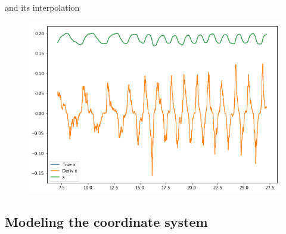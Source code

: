 \documentclass{beamer}
\begin{document}
\begin{frame}{and its interpolation}
\begin{figure}
	\centering
	\includegraphics[width=0.8\linewidth]{x}
\end{figure}
\end{frame}

\subsection{Modeling the coordinate system}
\end{document}
